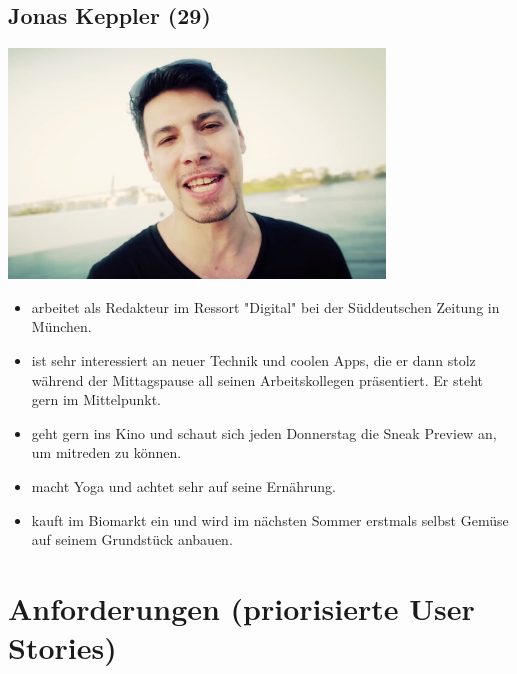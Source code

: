 \documentclass[10pt, a4paper, oneside, titlepage]{scrartcl} %
\begin{document}
	\subsection{Jonas Keppler (29)}
	\begin{center}
		\includegraphics[width=10.0cm]{persona_03.jpg}
	\end{center}
	\begin{itemize}
		\item{}arbeitet als Redakteur im Ressort "Digital" bei der Süddeutschen Zeitung in München.
		\item{}ist sehr interessiert an neuer Technik und coolen Apps, die er dann stolz während der Mittagspause all seinen Arbeitskollegen präsentiert. Er 				steht gern im Mittelpunkt.
		\item{}geht gern ins Kino und schaut sich jeden Donnerstag die Sneak Preview an, um mitreden zu können.
		\item{}macht Yoga und achtet sehr auf seine Ernährung.
		\item{}kauft im Biomarkt ein und wird im nächsten Sommer erstmals selbst Gemüse auf seinem Grundstück anbauen.
	\end{itemize}
	
   	\section{Anforderungen (priorisierte User Stories)}
\end{document}
